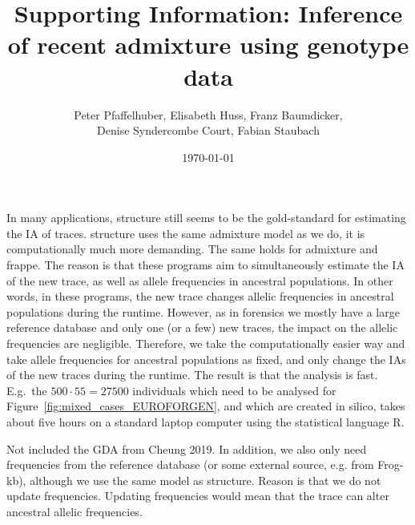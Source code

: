 \documentclass[12pt]{article}
\theoremstyle{definition}
\begin{document}
In many applications, {\sc structure} still seems to be the
gold-standard for estimating the IA of traces. {\sc structure} uses
the same admixture model as we do, it is computationally much more
demanding. The same holds for {\sc admixture} and {\sc frappe}. The
reason is that these programs aim to simultaneously estimate the IA of
the new trace, as well as allele frequencies in ancestral
populations. In other words, in these programs, the new trace changes
allelic frequencies in ancestral populations during the
runtime. However, as in forensics we mostly have a large reference
database and only one (or a few) new traces, the impact on the allelic
frequencies are negligible. Therefore, we take the computationally
easier way and take allele frequencies for ancestral populations as
fixed, and only change the IAs of the new traces during the
runtime. The result is that the analysis is fast. E.g.\ the
$500\cdot 55 = 27500$ individuals which need to be analysed for
Figure~\ref{fig:mixed_cases_EUROFORGEN}, and which are created in
silico, takes about five hours on a standard laptop computer using the
statistical language R.



Not included the GDA from Cheung 2019. In addition, we also only need
frequencies from the reference database (or some external source,
e.g. from Frog-kb), although we use the same model as
structure. Reason is that we do not update frequencies. Updating
frequencies would mean that the trace can alter ancestral allelic
frequencies.



 

\newpage
\setcounter{page}{1}
\setcounter{section}{0}
\setcounter{figure}{0}
\thispagestyle{empty}

\begin{center}
 \title{\LARGE Supporting Information: Inference
  of recent admixture using genotype data}

~~

\author{\sc Peter Pfaffelhuber, Elisabeth Huss, Franz Baumdicker, \\
  \sc Denise Syndercombe Court, Fabian Staubach}

~

\date{\today}

\maketitle
  
\end{center}
\end{document}
